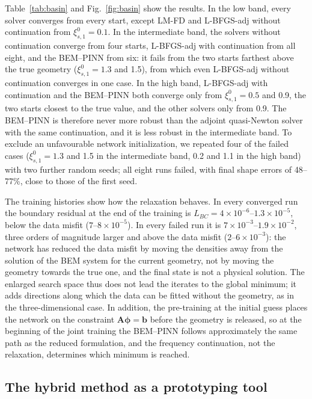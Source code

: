 \documentclass[11pt,twoside]{article}
\begin{document}
Table~\ref{tab:basin} and Fig.~\ref{fig:basin} show the results. In the low band, every solver converges from every start, except LM-FD and L-BFGS-adj without continuation from $\xi^0_{s,1}=0.1$. In the intermediate band, the solvers without continuation converge from four starts, L-BFGS-adj with continuation from all eight, and the BEM--PINN from six: it fails from the two starts farthest above the true geometry ($\xi^0_{s,1}=1.3$ and 1.5), from which even L-BFGS-adj without continuation converges in one case. In the high band, L-BFGS-adj with continuation and the BEM--PINN both converge only from $\xi^0_{s,1}=0.5$ and 0.9, the two starts closest to the true value, and the other solvers only from 0.9. The BEM--PINN is therefore never more robust than the adjoint quasi-Newton solver with the same continuation, and it is less robust in the intermediate band. To exclude an unfavourable network initialization, we repeated four of the failed cases ($\xi^0_{s,1}=1.3$ and 1.5 in the intermediate band, 0.2 and 1.1 in the high band) with two further random seeds; all eight runs failed, with final shape errors of 48--77\%, close to those of the first seed.

The training histories show how the relaxation behaves. In every converged run the boundary residual at the end of the training is $L_{BC}=4\times10^{-6}$--$1.3\times10^{-5}$, below the data misfit ($7$--$8\times10^{-5}$). In every failed run it is $7\times10^{-3}$--$1.9\times10^{-2}$, three orders of magnitude larger and above the data misfit ($2$--$6\times10^{-3}$): the network has reduced the data misfit by moving the densities away from the solution of the BEM system for the current geometry, not by moving the geometry towards the true one, and the final state is not a physical solution. The enlarged search space thus does not lead the iterates to the global minimum; it adds directions along which the data can be fitted without the geometry, as in the three-dimensional case. In addition, the pre-training at the initial guess places the network on the constraint $\mathbf{A}\boldsymbol{\phi}=\mathbf{b}$ before the geometry is released, so at the beginning of the joint training the BEM--PINN follows approximately the same path as the reduced formulation, and the frequency continuation, not the relaxation, determines which minimum is reached.

\subsection{The hybrid method as a prototyping tool}\label{sec:prototype}
\end{document}
